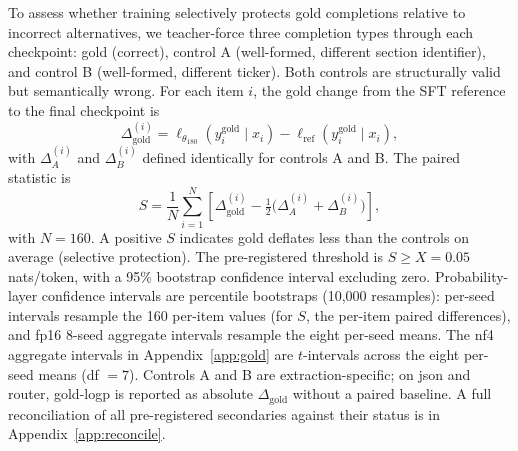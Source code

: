\documentclass{article}
\begin{document}
To assess whether training selectively protects gold completions relative to incorrect alternatives, we teacher-force three completion types through each checkpoint: gold (correct), control A (well-formed, different section identifier), and control B (well-formed, different ticker). Both controls are structurally valid but semantically wrong. For each item $i$, the gold change from the SFT reference to the final checkpoint is
\begin{equation}
\Delta_{\text{gold}}^{(i)} = \ell_{\theta_{180}}(y_i^{\text{gold}} \mid x_i) - \ell_{\text{ref}}(y_i^{\text{gold}} \mid x_i),
\label{eq:dgold}
\end{equation}
with $\Delta_A^{(i)}$ and $\Delta_B^{(i)}$ defined identically for controls A and B. The paired statistic is
\begin{equation}
S = \frac{1}{N} \sum_{i=1}^{N} \left[ \Delta_{\text{gold}}^{(i)} - \tfrac{1}{2}\big(\Delta_A^{(i)} + \Delta_B^{(i)}\big) \right],
\label{eq:goldstat}
\end{equation}
with $N = 160$. A positive $S$ indicates gold deflates less than the controls on average (selective protection). The pre-registered threshold is $S \geq X = 0.05$ nats/token, with a 95\% bootstrap confidence interval excluding zero. Probability-layer confidence intervals are percentile bootstraps (10{,}000 resamples): per-seed intervals resample the 160 per-item values (for $S$, the per-item paired differences), and fp16 8-seed aggregate intervals resample the eight per-seed means. The nf4 aggregate intervals in Appendix~\ref{app:gold} are $t$-intervals across the eight per-seed means (df $= 7$). Controls A and B are extraction-specific; on json and router, gold-logp is reported as absolute $\Delta_{\text{gold}}$ without a paired baseline. A full reconciliation of all pre-registered secondaries against their status is in Appendix~\ref{app:reconcile}.
\end{document}
